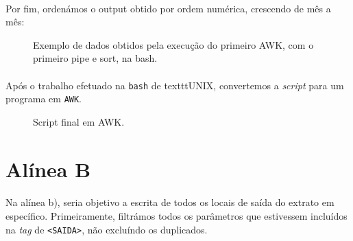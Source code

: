\documentclass[11pt,a4paper]{report}
\begin{document}
\paragraph*{}Por fim, ordenámos o output obtido por ordem numérica, crescendo de mês a mês:

\begin{figure}[H]
\centering
\noindent{}
\caption{Exemplo de dados obtidos pela execução do primeiro AWK, com o primeiro pipe e sort, na bash.}
\end{figure}

\paragraph*{}Após o trabalho efetuado na \texttt{bash} de texttt{UNIX}, convertemos a \textit{script} para um programa em \texttt{AWK}.

\begin{figure}[H]
\centering
\noindent{}
\caption{Script final em AWK.}
\end{figure}


\section{Alínea B}


\paragraph*{}Na alínea b), seria objetivo a escrita de todos os locais de saída do extrato em específico. 	Primeiramente, filtrámos todos os parâmetros que estivessem incluídos na \textit{tag} de \texttt{<SAIDA>}, não excluíndo os duplicados.
\end{document}
